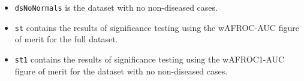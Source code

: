 \documentclass[
]{book}
\begin{document}
\begin{itemize}
\item
  \texttt{dsNoNormals} is the dataset with no non-diseased cases.
\item
  \texttt{st} contains the results of significance testing using the wAFROC-AUC figure of merit for the full dataset.
\item
  \texttt{st1} contains the results of significance testing using the wAFROC1-AUC figure of merit for the dataset with no non-diseased cases.
\end{itemize}

  
\end{document}
